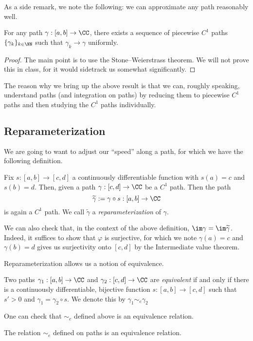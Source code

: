 As a side remark, we note the following: we can approximate any path reasonably well.
\begin{theorem}
	For any path $\gamma:[a,b]\to\CC$, there exists a sequence of piecewise $C^1$ paths $\{\gamma_k\}_{k\in\NN}$ such that $\gamma_k\to\gamma$ uniformly.
\end{theorem}
\begin{proof}
	The main point is to use the Stone--Weierstrass theorem. We will not prove this in class, for it would sidetrack us somewhat significantly.
\end{proof}
The reason why we bring up the above result is that we can, roughly speaking, understand paths (and integration on paths) by reducing them to piecewise $C^1$ paths and then studying the $C^1$ paths individually.

\subsection{Reparameterization}
We are going to want to adjust our ``speed'' along a path, for which we have the following definition.
\begin{definition}[Reparameterization]
	Fix $s:[a,b]\to[c,d]$ a continuously differentiable function with $s(a)=c$ and $s(b)=d$. Then, given a path $\gamma:[c,d]\to\CC$ be a $C^1$ path. Then the path
	\[\widetilde\gamma:=\gamma\circ s:[a,b]\to\CC\]
	is again a $C^1$ path. We call $\widetilde{\gamma}$ a \textit{reparameterization} of $\gamma$.
\end{definition}
\begin{remark}
	We can also check that, in the context of the above definition, $\im\gamma=\im\widetilde{\gamma}$. Indeed, it suffices to show that $\varphi$ is surjective, for which we note $\gamma(a)=c$ and $\gamma(b)=d$ gives us surjectivity onto $[c,d]$ by the Intermediate value theorem.
\end{remark}
Reparameterization allows us a notion of equivalence.
\begin{definition}[Equivalent]
	Two paths $\gamma_1:[a,b]\to\CC$ and $\gamma_2:[c,d]\to\CC$ are \textit{equivalent} if and only if there is a continuously differentiable, bijective function $s:[a,b]\to[c,d]$ such that $s'>0$ and $\gamma_1=\gamma_2\circ s$. We denote this by $\gamma_1\sim_e\gamma_2$
\end{definition}
One can check that $\sim_e$ defined above is an equivalence relation.
\begin{lemma}
	The relation $\sim_e$ defined on paths is an equivalence relation.
\end{lemma}

